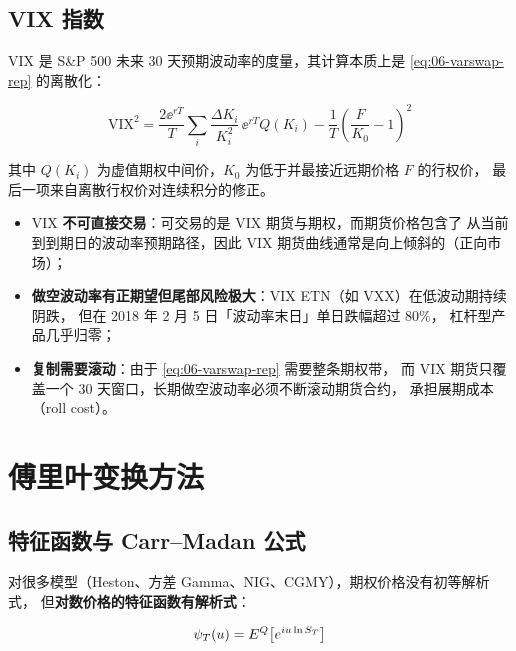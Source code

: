 \subsection{VIX 指数}

VIX 是 S\&P 500 未来 30 天预期波动率的度量，其计算本质上是 \cref{eq:06-varswap-rep} 的离散化：

\begin{equation}
  \text{VIX}^2 = \frac{2\ee^{rT}}{T}\sum_i\frac{\Delta K_i}{K_i^{2}}\,\ee^{rT}Q(K_i)
              - \frac{1}{T}\left(\frac{F}{K_0}-1\right)^{2}
  \label{eq:06-vix}
\end{equation}

其中 $Q(K_i)$ 为虚值期权中间价，$K_0$ 为低于并最接近远期价格 $F$ 的行权价，
最后一项来自离散行权价对连续积分的修正。

\begin{appbox}
\begin{itemize}[leftmargin=1.4em]
  \item VIX \textbf{不可直接交易}：可交易的是 VIX 期货与期权，而期货价格包含了
        从当前到到期日的波动率预期路径，因此 VIX 期货曲线通常是向上倾斜的（正向市场）；
  \item \textbf{做空波动率有正期望但尾部风险极大}：VIX ETN（如 VXX）在低波动期持续阴跌，
        但在 2018 年 2 月 5 日「波动率末日」单日跌幅超过 80\%，
        杠杆型产品几乎归零；
  \item \textbf{复制需要滚动}：由于 \cref{eq:06-varswap-rep} 需要整条期权带，
        而 VIX 期货只覆盖一个 30 天窗口，长期做空波动率必须不断滚动期货合约，
        承担展期成本（roll cost）。
\end{itemize}
\end{appbox}

\section{傅里叶变换方法}

\subsection{特征函数与 Carr--Madan 公式}

对很多模型（Heston、方差 Gamma、NIG、CGMY），期权价格没有初等解析式，
但\textbf{对数价格的特征函数有解析式}：

\begin{equation}
  \psi_T(u) = E^{Q}\!\left[e^{i u\ln S_T}\right]
  \label{eq:06-cf}
\end{equation}

